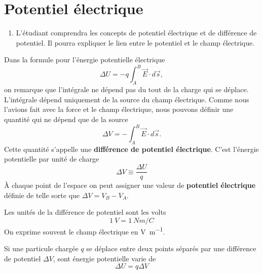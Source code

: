 


\section{Potentiel électrique}



\begin{enumerate}
  \item L'étudiant comprendra les concepts de potentiel électrique et de
    différence de potentiel. Il pourra expliquer le lien entre le potentiel et
    le champ électrique.
\end{enumerate}



Dans la formule pour l'énergie potentielle électrique
\[
  \Delta U = -q \int_A^B \vec{E}\cdot d\vec{s},
\]
on remarque que l'intégrale ne dépend pas du tout de la charge qui se déplace.
L'intégrale dépend uniquement de la source du champ électrique. Comme nous
l'avions fait avec la force et le champ électrique, nous pouvons définir une
quantité qui ne dépend que de la source
\[
  \Delta V = - \int_A^B \vec{E}\cdot d\vec{s}.
\]
Cette quantité s'appelle une \textbf{différence de potentiel électrique}.
C'est l'énergie potentielle par unité de charge
\[
  \Delta V \equiv \frac{\Delta U}{q}
\]
À chaque point de l'espace on peut assigner une valeur de \textbf{potentiel
  électrique} définie de telle sorte que $\Delta V = V_B - V_A$.

Les unités de la différence de potentiel sont les volts
$$\SI{1}{V} = \SI{1}{Nm/C}$$
On exprime souvent le champ électrique en \si{\volt\per\meter}.

Si une particule chargée $q$ se déplace entre deux points séparés par une
différence de potentiel $\Delta V$, sont énergie potentielle varie de
\[
  \Delta U = q \Delta V
\]


